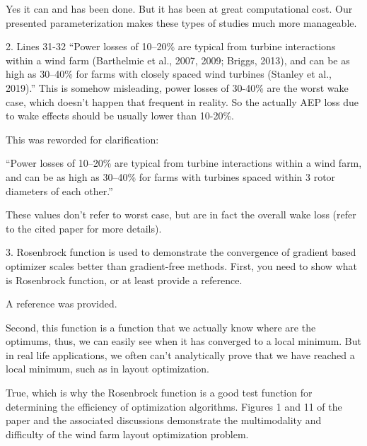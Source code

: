 \documentclass[12pt]{report}
\begin{document}
Yes it can and has been done. But it has been at great computational cost. Our presented parameterization makes these types of studies much more manageable. 

\color{black}
\bigskip

2. Lines 31-32 “Power losses of 10–20\% are typical from turbine interactions within a wind farm (Barthelmie et al., 2007, 2009; Briggs, 2013), and can be as high as 30–40\% for farms with closely spaced wind turbines (Stanley et al., 2019).” This is somehow misleading, power losses of 30-40\% are the worst wake case, which doesn’t happen that frequent in reality. So the actually AEP loss due to wake effects should be usually lower than 10-20\%. 

\bigskip
\color{blue}

This was reworded for clarification:
\smallskip

``Power losses of 10--20\% are typical from turbine interactions within a wind farm, and can be as high as 30--40\% for farms with turbines spaced within 3 rotor diameters of each other.''
\smallskip

These values don't refer to worst case, but are in fact the overall wake loss (refer to the cited paper for more details).

\color{black}
\bigskip

3. Rosenbrock function is used to demonstrate the convergence of gradient based optimizer scales better than gradient-free methods. First, you need to show what is Rosenbrock function, or at least provide a reference. 

\bigskip
\color{blue}

A reference was provided.

\color{black}
\bigskip

Second, this function is a function that we actually know where are the optimums, thus, we can easily see when it has converged to a local minimum. But in real life applications, we often can’t analytically prove that we have reached a local minimum, such as in layout optimization. 

\bigskip
\color{blue}

True, which is why the Rosenbrock function is a good test function for determining the efficiency of optimization algorithms. Figures 1 and 11 of the paper and the associated discussions demonstrate the multimodality and difficulty of the wind farm layout optimization problem.

\color{black}
\bigskip
\end{document}
